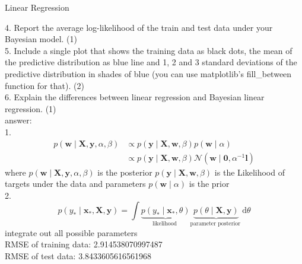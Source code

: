 \documentclass[
	ngerman,
     solution=true
	]{tudaexercise}
\begin{document}
\begin{task}{Linear Regression}
\begin{subtask}[1d)]
4. Report the average log-likelihood of the train and test data under your Bayesian model. (1)\\[15pt]
5. Include a single plot that shows the training data as black dots, the mean of the predictive distribution as blue
line and 1, 2 and 3 standard deviations of the predictive distribution in shades of blue (you can use matplotlib’s
fill\_between function for that). (2)\\[15pt]
6. Explain the differences between linear regression and Bayesian linear regression. (1)
\\[15pt]
answer:\\[15pt]
1.
\[
\begin{aligned}
p(\mathbf{w} \mid \mathbf{X}, \mathbf{y}, \alpha, \beta) & \propto p(\mathbf{y} \mid \mathbf{X}, \mathbf{w}, \beta) p(\mathbf{w} \mid \alpha) \\
& \propto p(\mathbf{y} \mid \mathbf{X}, \mathbf{w}, \beta) \mathcal{N}\left(\mathbf{w} \mid \mathbf{0}, \alpha^{-1} \mathbf{l}\right)
\end{aligned}
\]
where 
$p(\mathbf{w} \mid \mathbf{X}, \mathbf{y}, \alpha, \beta)$ is the posterior
$p(\mathbf{y} \mid \mathbf{X}, \mathbf{w}, \beta) $ is the Likelihood of targets under the data and parameters
$p(\mathbf{w} \mid \alpha)$ is the prior\\[15pt]

2.
\[
p\left(y_{*} \mid \mathbf{x}_{*}, \mathbf{X}, \mathbf{y}\right)=\int \underbrace{p\left(y_{*} \mid \mathbf{x}_{*}, \theta\right)}_{\text {likelihood }} \underbrace{p(\theta \mid \mathbf{X}, \mathbf{y})}_{\text {parameter posterior }} \mathrm{d} \theta
\]
integrate out all possible parameters\\%
RMSE of training data: 2.914538070997487 \\
RMSE of test data: 3.8433605616561968\\


\end{subtask}
\end{task}
\end{document}
